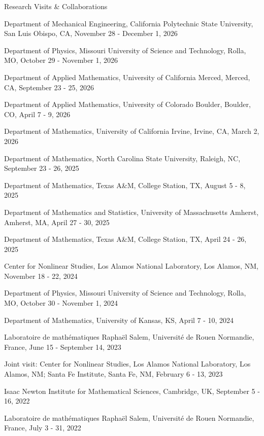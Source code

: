 \documentclass[10pt]{article} %
\newenvironment{innerlist}[1][\enskip\textbullet]%
        {\begin{compactitem}[#1]}{\end{compactitem}}
\begin{document}
\begin{section}{Research Visits \& Collaborations}
\begin{innerlist}
\setlength\itemsep{1em}
\item \vskip -4.3mm
Department of Mechanical Engineering, California Polytechnic State University, San Luis Obispo, CA, November 28 - December 1, 2026
\item Department of Physics, Missouri University of Science and Technology, Rolla, MO, October 29 - November 1, 2026
\item Department of Applied Mathematics, University of California Merced, Merced, CA, September 23 - 25, 2026
\item Department of Applied Mathematics, University of Colorado Boulder, Boulder, CO, April 7 - 9, 2026
\item Department of Mathematics, University of California Irvine, Irvine, CA, March 2, 2026
\item Department of Mathematics, North Carolina State University, Raleigh, NC, September 23 - 26, 2025
\item Department of Mathematics, Texas A\&M, College Station, TX, August 5 - 8, 2025
\item Department of Mathematics and Statistics, University of Massachusetts Amherst,
Amherst, MA, April 27 - 30, 2025
\item Department of Mathematics, Texas A\&M, College Station, TX, April 24 - 26, 2025
\item Center for Nonlinear Studies, Los Alamos National Laboratory, Los Alamos, NM, November 18 - 22, 2024
\item Department of Physics, Missouri University of Science and Technology, Rolla, MO, October 30 - November 1, 2024
\item Department of Mathematics, University of Kansas, KS, April 7 - 10, 2024
\item Laboratoire de math\'ematiques Rapha\"el Salem, Universit\'e de Rouen Normandie, France, June 15 - September 14, 2023
\item Joint visit: Center for Nonlinear Studies, Los Alamos National Laboratory, Los Alamos, NM;
Santa Fe Institute, Santa Fe, NM, February 6 - 13, 2023
\item Isaac Newton Institute for Mathematical Sciences, Cambridge, UK, September 5 - 16, 2022
\item Laboratoire de math\'ematiques Rapha\"el Salem, Universit\'e de Rouen Normandie, France, July 3 - 31, 2022

\end{innerlist}
\end{section}
\end{document}
